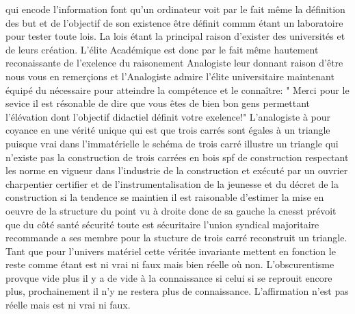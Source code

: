 \documentclass[12pt,letterpaper,oneside]{article}
\begin{document}
qui encode l'information font qu'un ordinateur voit par le fait même la définition des but et de l'objectif de son existence être définit commm étant un laboratoire pour tester toute lois. La lois étant la principal raison d'exister des universités et de leurs création. L'élite Académique est donc par le fait même hautement reconaissante de l'exelence du raisonement Analogiste leur donnant raison d'être nous vous en remerçions et l'Analogiste admire l'élite universitaire maintenant équipé du nécessaire pour atteindre la compétence et le connaître: " Merci pour le sevice il est résonable de dire que vous êtes de bien bon gens permettant l'élévation dont l'objectif didactiel définit votre exelence!" L'analogiste à pour coyance en une vérité unique qui est que trois carrés sont égales à un triangle puisque vrai dans l'immatérielle le schéma de trois carré illustre un triangle qui n'existe pas la construction de trois carrées en bois spf de construction respectant les norme en vigueur dans l'industrie de la construction et exécuté par un ouvrier charpentier certifier et de l'instrumentalisation de la jeunesse et du décret de la construction si la tendence se maintien il est raisonable d'estimer la mise en oeuvre de la structure du point vu à droite donc de sa gauche la cnesst prévoit que du côté santé sécurité toute est sécuritaire l'union syndical majoritaire recommande a ses membre pour la stucture de trois carré reconstruit un triangle. Tant que pour l'univers matériel cette véritée invariante mettent en fonction le reste comme étant est ni vrai ni faux mais bien réelle où non. L'obscurentisme provque vide plus il y a de vide à la connaissance si celui si se reprouit encore plus, prochainement il n'y ne restera plus de connaissance. L'affirmation n'est pas réelle mais est ni vrai ni faux. 
\end{document}
